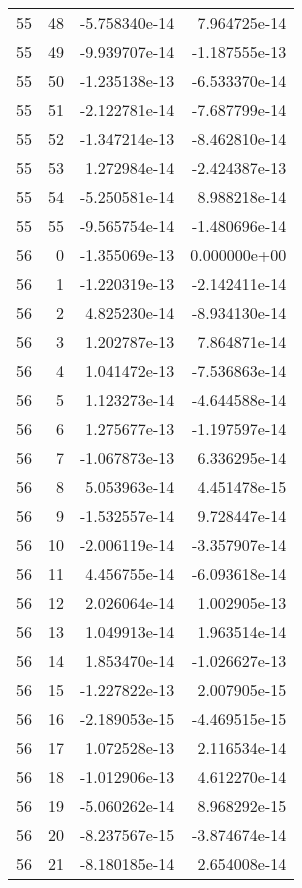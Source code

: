 \begin{tabular}{rrrr}
  55 &   48 & -5.758340e-14 &  7.964725e-14 \\
  55 &   49 & -9.939707e-14 & -1.187555e-13 \\
  55 &   50 & -1.235138e-13 & -6.533370e-14 \\
  55 &   51 & -2.122781e-14 & -7.687799e-14 \\
  55 &   52 & -1.347214e-13 & -8.462810e-14 \\
  55 &   53 &  1.272984e-14 & -2.424387e-13 \\
  55 &   54 & -5.250581e-14 &  8.988218e-14 \\
  55 &   55 & -9.565754e-14 & -1.480696e-14 \\
  56 &    0 & -1.355069e-13 &  0.000000e+00 \\
  56 &    1 & -1.220319e-13 & -2.142411e-14 \\
  56 &    2 &  4.825230e-14 & -8.934130e-14 \\
  56 &    3 &  1.202787e-13 &  7.864871e-14 \\
  56 &    4 &  1.041472e-13 & -7.536863e-14 \\
  56 &    5 &  1.123273e-14 & -4.644588e-14 \\
  56 &    6 &  1.275677e-13 & -1.197597e-14 \\
  56 &    7 & -1.067873e-13 &  6.336295e-14 \\
  56 &    8 &  5.053963e-14 &  4.451478e-15 \\
  56 &    9 & -1.532557e-14 &  9.728447e-14 \\
  56 &   10 & -2.006119e-14 & -3.357907e-14 \\
  56 &   11 &  4.456755e-14 & -6.093618e-14 \\
  56 &   12 &  2.026064e-14 &  1.002905e-13 \\
  56 &   13 &  1.049913e-14 &  1.963514e-14 \\
  56 &   14 &  1.853470e-14 & -1.026627e-13 \\
  56 &   15 & -1.227822e-13 &  2.007905e-15 \\
  56 &   16 & -2.189053e-15 & -4.469515e-15 \\
  56 &   17 &  1.072528e-13 &  2.116534e-14 \\
  56 &   18 & -1.012906e-13 &  4.612270e-14 \\
  56 &   19 & -5.060262e-14 &  8.968292e-15 \\
  56 &   20 & -8.237567e-15 & -3.874674e-14 \\
  56 &   21 & -8.180185e-14 &  2.654008e-14 \\

\end{tabular}
